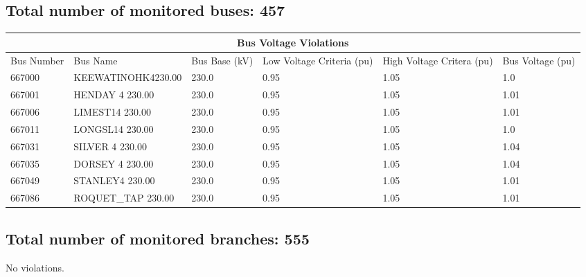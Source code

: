\documentclass{article}%
\begin{document}
\subsection*{Total number of monitored buses: 457}%
\label{subsec:Totalnumberofmonitoredbuses457}%
\begin{tabularx}{\textwidth}{| p{2cm} | p{4 cm} | p{1.58cm} | p{2.1cm} | p{2.1cm} | p{2.1cm} |}%
\hline%
\multicolumn{6}{|c|}{Bus Voltage Violations}\\%
\hline%
Bus Number&Bus Name&Bus Base (kV)&Low Voltage Criteria (pu)&High Voltage Critera (pu)&Bus Voltage (pu)\\%
\hline%
667000&KEEWATINOHK4230.00&230.0&0.95&1.05&1.0\\%
\hline%
667001&HENDAY 4    230.00&230.0&0.95&1.05&1.01\\%
\hline%
667006&LIMEST14    230.00&230.0&0.95&1.05&1.01\\%
\hline%
667011&LONGSL14    230.00&230.0&0.95&1.05&1.0\\%
\hline%
667031&SILVER 4    230.00&230.0&0.95&1.05&1.04\\%
\hline%
667035&DORSEY 4    230.00&230.0&0.95&1.05&1.04\\%
\hline%
667049&STANLEY4    230.00&230.0&0.95&1.05&1.01\\%
\hline%
667086&ROQUET\_TAP  230.00&230.0&0.95&1.05&1.01\\%
\hline%
\end{tabularx}

%
\subsection*{Total number of monitored branches: 555}%
\label{subsec:Totalnumberofmonitoredbranches555}%
No violations.

%
\end{document}
